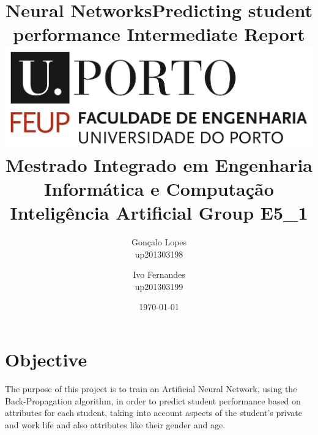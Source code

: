 \documentclass[11pt]{article}
\begin{document}
\setlength{\textwidth}{20cm}
\setlength{\textheight}{22cm}
\title{\Huge\textbf{Neural Networks}\linebreak \small{Predicting student performance} \linebreak\linebreak
\Large\textbf{Intermediate Report}\linebreak\linebreak
\linebreak\linebreak
\includegraphics[scale=0.1]{feup-logo.png}\linebreak\linebreak
\linebreak\linebreak
\Large{Mestrado Integrado em Engenharia Informática e Computação} \linebreak\linebreak
\Large{Inteligência Artificial}\linebreak\linebreak
\Large{Group E5\_1}
}

\author{
Gonçalo Lopes\\ up201303198\\
\and
Ivo Fernandes\\ up201303199\\
}
\date{\today}
\maketitle
\newpage
\tableofcontents
\newpage

\section{Objective}

The purpose of this project is to train an Artificial Neural Network, using the Back-Propagation algorithm, in order to predict student performance based on attributes for each student, taking into account aspects of the student's private and work life and also attributes like their gender and age.
\end{document}
